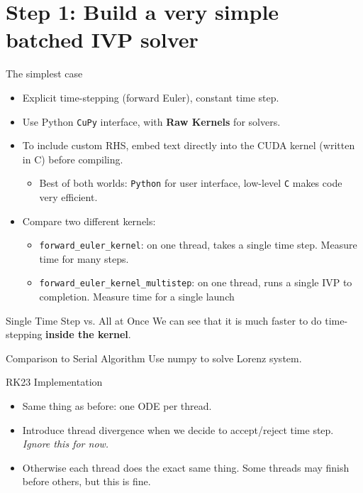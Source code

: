 \section{Step 1: Build a very simple batched IVP solver}

\begin{frame}{The simplest case}
    
\begin{itemize}
\item Explicit time-stepping (forward Euler), constant time step.
\item Use Python \texttt{CuPy} interface, with \textbf{Raw Kernels} for solvers.
\item To include custom RHS, embed text directly into the CUDA kernel (written in C) before compiling.
\begin{itemize}
    \item Best of both worlds: \texttt{Python} for user interface, low-level \texttt{C} makes code very efficient.
\end{itemize}
\item Compare two different kernels:
\begin{itemize}
    \item \texttt{forward\_euler\_kernel}: on one thread, takes a single time step. Measure time for many steps.
    \item \texttt{forward\_euler\_kernel\_multistep}: on one thread, runs a single IVP to completion. Measure time for a single launch
\end{itemize}
\end{itemize}
\end{frame}

\begin{frame}{Single Time Step vs. All at Once}
We can see that it is much faster to do time-stepping \textbf{inside the kernel}.
\end{frame}


\begin{frame}{Comparison to Serial Algorithm}
    Use numpy to solve Lorenz system.
\end{frame}

\begin{frame}{RK23 Implementation}
\begin{itemize}
\item Same thing as before: one ODE per thread.
\item Introduce thread divergence when we decide to accept/reject time step. \textit{Ignore this for now.}
\item Otherwise each thread does the exact same thing. Some threads may finish before others, but this is fine.
\end{itemize}
\end{frame}

\begin{frame}

\end{frame}
